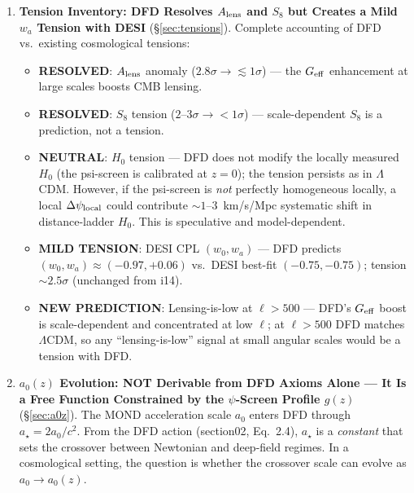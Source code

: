 \documentclass[11pt,a4paper]{article}
\newcommand{\astar}{a_\star}
\newcommand{\LCDM}{$\Lambda$CDM}
\newcommand{\Geff}{G_{\rm eff}}
\newcommand{\Dpsi}{\Delta\psi}
\begin{document}
\begin{tcolorbox}[colback=yellow!5!white, colframe=red!70!black,
  title=\textbf{TOP 5 FINDINGS --- WAVE 4, ITERATION 15}]
\begin{enumerate}
\item \textbf{Tension Inventory: DFD Resolves $A_{\rm lens}$ and
  $S_8$ but Creates a Mild $w_a$ Tension with DESI}
  (\S\ref{sec:tensions}).
  Complete accounting of DFD vs.\ existing cosmological tensions:
  \begin{itemize}[nosep]
  \item \textbf{RESOLVED}: $A_{\rm lens}$ anomaly
    ($2.8\sigma \to \lesssim 1\sigma$) --- the $\Geff$ enhancement
    at large scales boosts CMB lensing.
  \item \textbf{RESOLVED}: $S_8$ tension ($2$--$3\sigma \to < 1\sigma$)
    --- scale-dependent $S_8$ is a prediction, not a tension.
  \item \textbf{NEUTRAL}: $H_0$ tension --- DFD does not modify the
    locally measured $H_0$ (the psi-screen is calibrated at $z = 0$);
    the tension persists as in \LCDM.  However, if the psi-screen
    is \emph{not} perfectly homogeneous locally, a local $\Dpsi_{\rm local}$
    could contribute $\sim 1$--$3$~km/s/Mpc systematic shift in
    distance-ladder $H_0$.  This is speculative and model-dependent.
  \item \textbf{MILD TENSION}: DESI CPL $(w_0, w_a)$ --- DFD predicts
    $(w_0, w_a) \approx (-0.97, +0.06)$ vs.\ DESI best-fit
    $(-0.75, -0.75)$; tension $\sim 2.5\sigma$ (unchanged from i14).
  \item \textbf{NEW PREDICTION}: Lensing-is-low at $\ell > 500$ ---
    DFD's $\Geff$ boost is scale-dependent and concentrated at low
    $\ell$; at $\ell > 500$ DFD matches \LCDM, so any ``lensing-is-low''
    signal at small angular scales would be a tension with DFD.
  \end{itemize}

\item \textbf{$a_0(z)$ Evolution: NOT Derivable from DFD Axioms
  Alone --- It Is a Free Function Constrained by the $\psi$-Screen
  Profile $g(z)$}
  (\S\ref{sec:a0z}).
  The MOND acceleration scale $a_0$ enters DFD through
  $\astar = 2a_0/c^2$.  From the DFD action (section02, Eq.~2.4),
  $\astar$ is a \emph{constant} that sets the crossover between
  Newtonian and deep-field regimes.  In a cosmological setting, the
  question is whether the crossover scale can evolve as
  $a_0 \to a_0(z)$.


\end{enumerate}
\end{tcolorbox}
\end{document}
